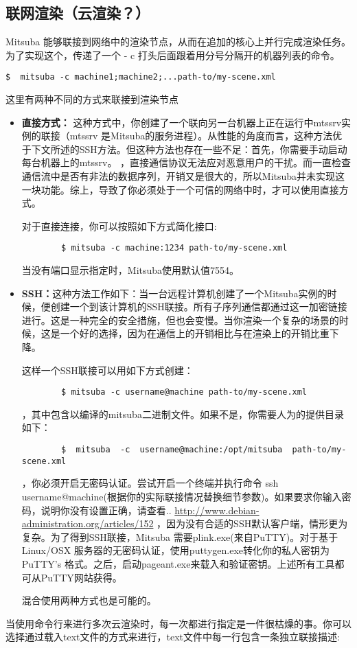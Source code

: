 \subsection{联网渲染（云渲染？）}
Mitsuba 能够联接到网络中的渲染节点，从而在追加的核心上并行完成渲染任务。为了实现这个，传递了一个 - c 打头后面跟着用分号分隔开的机器列表的命令。
\begin{lstlisting}
$  mitsuba -c machine1;machine2;...path-to/my-scene.xml
\end{lstlisting}
\par 
这里有两种不同的方式来联接到渲染节点
\begin{itemize}
	\item \textbf{直接方式：} 这种方式中，你创建了一个联向另一台机器上正在运行中mtssrv实例的联接（mtssrv 是Mitsuba的服务进程）。从性能的角度而言，这种方法优于下文所述的SSH方法。但这种方法也存在一些不足：首先，你需要手动启动每台机器上的mtssrv。
	，直接通信协议无法应对恶意用户的干扰。而一直检查通信流中是否有非法的数据序列，开销又是很大的，所以Mitsuba并未实现这一块功能。综上，导致了你必须处于一个可信的网络中时，才可以使用直接方式。
	\par 对于直接连接，你可以按照如下方式简化接口:
	\begin{lstlisting}
		$ mitsuba -c machine:1234 path-to/my-scene.xml
	\end{lstlisting}
	当没有端口显示指定时，Mitsuba使用默认值7554。
	
	\item \textbf{SSH：}这种方法工作如下：当一台远程计算机创建了一个Mitsuba实例的时候，便创建一个到该计算机的SSH联接。所有子序列通信都通过这一加密链接进行。这是一种完全的安全措施，但也会变慢。当你渲染一个复杂的场景的时候，这是一个好的选择，因为在通信上的开销相比与在渲染上的开销比重下降。
	\par 这样一个SSH联接可以用如下方式创建：
	\begin{lstlisting}
		$ mitsuba -c username@machine path-to/my-scene.xml
	\end{lstlisting}
	，其中包含以编译的mitsuba二进制文件。如果不是，你需要人为的提供目录如下：
	\begin{lstlisting}
		$  mitsuba  -c  username@machine:/opt/mitsuba  path-to/my-scene.xml
	\end{lstlisting}
	，你必须开启无密码认证。尝试开启一个终端并执行命令 ssh username@machine(根据你的实际联接情况替换细节参数)。如果要求你输入密码，说明你没有设置正确，请查看..
	\url{http://www.debian-administration.org/articles/152}
	，因为没有合适的SSH默认客户端，情形更为复杂。为了得到SSH联接，Mitsuba 需要plink.exe(来自PuTTY)。对于基于Linux/OSX 服务器的无密码认证，使用puttygen.exe转化你的私人密钥为PuTTY’s 格式。之后，启动pageant.exe来载入和验证密钥。上述所有工具都可从PuTTY网站获得。
	\par 混合使用两种方式也是可能的。
\end{itemize}
\par 当使用命令行来进行多次云渲染时，每一次都进行指定是一件很枯燥的事。你可以选择通过载入text文件的方式来进行，text文件中每一行包含一条独立联接描述:

